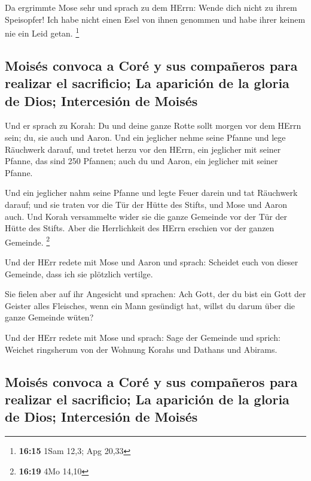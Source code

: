  Da ergrimmte Mose sehr und sprach zu dem HErrn: Wende
dich nicht zu ihrem Speisopfer! Ich habe nicht einen Esel von ihnen
genommen und habe ihrer keinem nie ein Leid getan. \footnote{\textbf{16:15}
  1Sam 12,3; Apg 20,33}

\hypertarget{moisuxe9s-convoca-a-coruxe9-y-sus-compauxf1eros-para-realizar-el-sacrificio-la-apariciuxf3n-de-la-gloria-de-dios-intercesiuxf3n-de-moisuxe9s}{%
\subsection{Moisés convoca a Coré y sus compañeros para realizar el
sacrificio; La aparición de la gloria de Dios; Intercesión de
Moisés}\label{moisuxe9s-convoca-a-coruxe9-y-sus-compauxf1eros-para-realizar-el-sacrificio-la-apariciuxf3n-de-la-gloria-de-dios-intercesiuxf3n-de-moisuxe9s}}

 Und er sprach zu Korah: Du und deine ganze Rotte sollt
morgen vor dem HErrn sein; du, sie auch und Aaron.  Und
ein jeglicher nehme seine Pfanne und lege Räuchwerk darauf, und tretet
herzu vor den HErrn, ein jeglicher mit seiner Pfanne, das sind 250
Pfannen; auch du und Aaron, ein jeglicher mit seiner Pfanne.

 Und ein jeglicher nahm seine Pfanne und legte Feuer
darein und tat Räuchwerk darauf; und sie traten vor die Tür der Hütte
des Stifts, und Mose und Aaron auch.  Und Korah
versammelte wider sie die ganze Gemeinde vor der Tür der Hütte des
Stifts. Aber die Herrlichkeit des HErrn erschien vor der ganzen
Gemeinde. \footnote{\textbf{16:19} 4Mo 14,10}

 Und der HErr redete mit Mose und Aaron und sprach:
 Scheidet euch von dieser Gemeinde, dass ich sie
plötzlich vertilge.

 Sie fielen aber auf ihr Angesicht und sprachen: Ach
Gott, der du bist ein Gott der Geister alles Fleisches, wenn ein Mann
gesündigt hat, willst du darum über die ganze Gemeinde wüten?

 Und der HErr redete mit Mose und sprach: 
Sage der Gemeinde und sprich: Weichet ringsherum von der Wohnung Korahs
und Dathans und Abirams.

\hypertarget{moisuxe9s-convoca-a-coruxe9-y-sus-compauxf1eros-para-realizar-el-sacrificio-la-apariciuxf3n-de-la-gloria-de-dios-intercesiuxf3n-de-moisuxe9s-1}{%
\subsection{Moisés convoca a Coré y sus compañeros para realizar el
sacrificio; La aparición de la gloria de Dios; Intercesión de
Moisés}\label{moisuxe9s-convoca-a-coruxe9-y-sus-compauxf1eros-para-realizar-el-sacrificio-la-apariciuxf3n-de-la-gloria-de-dios-intercesiuxf3n-de-moisuxe9s-1}}

